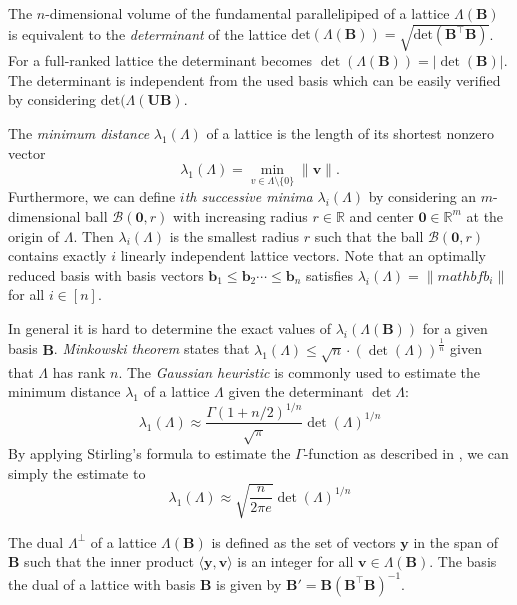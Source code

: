 The $n$-dimensional volume of the fundamental parallelipiped of a lattice $\Lambda(\mathbf{B})$ is equivalent to the \textit{determinant} of the lattice $\text{det}(\Lambda(\mathbf{B})) = \sqrt{\text{det}\left(\mathbf{B}^\intercal \mathbf{B}\right)}$. For a full-ranked lattice the determinant becomes $\det(\Lambda(\mathbf{B})) = |\det(\mathbf{B})|$. The determinant is independent from the used basis which can be easily verified by considering  $\text{det}(\Lambda(\mathbf{U}\mathbf{B})$.

The \textit{minimum distance} $\lambda_1(\Lambda)$ of a lattice is the length of its shortest nonzero vector
\begin{equation}
    \lambda_1(\Lambda) = \min_{v \in \Lambda \setminus \{0\}}\|\mathbf{v}\|.
\end{equation}
Furthermore, we can define \textit{$i$th successive minima} $\lambda_i(\Lambda)$ by considering an $m$-dimensional ball $\mathcal{B}(\mathbf{0}, r)$ with increasing radius $r \in \mathbb{R}$ and center $\mathbf{0} \in \mathbb{R}^m$ at the origin of $\Lambda$. Then  $\lambda_i(\Lambda)$ is the smallest radius $r$ such that the ball $\mathcal{B}(\mathbf{0}, r)$ contains exactly $i$ linearly independent lattice vectors. Note that an optimally reduced basis with basis vectors $\mathbf{b}_1 \leq \mathbf{b}_2 \cdots \leq \mathbf{b}_n$ satisfies $\lambda_i(\Lambda) = \|mathbf{b}_i\|$ for all $i\in [n]$.


In general it is hard to determine the exact values of $\lambda_i(\Lambda(\mathbf{B}))$ for a given basis $\mathbf{B}$. \textit{Minkowski theorem} states that $\lambda_1(\Lambda) \leq \sqrt{n} \cdot (\det(\Lambda))^{\frac{1}{n}}$ given that $\Lambda$ has rank $n$.
The \textit{Gaussian heuristic} is commonly used to estimate the minimum distance $\lambda_1$ of a lattice $\Lambda$ given the determinant $\det{\Lambda}$:
\begin{equation}\label{eq:gaussian-heuristic}
    \lambda_1(\Lambda) \approx \frac{\Gamma(1 + n/2)^{1/n}}{\sqrt{\pi}} \det(\Lambda)^{1/n}
\end{equation}
By applying Stirling's formula to estimate the $\Gamma$-function as described in \cite{Gop16}, we can simply the estimate to
\begin{equation}\label{eq:simplified-gaussian-heuristic}
    \lambda_1(\Lambda) \approx \sqrt{\frac{n}{2\pi e}} \det(\Lambda)^{1/n}
\end{equation}

The dual $\Lambda^{\perp}$ of a lattice $\Lambda(\mathbf{B})$ is defined as the set of vectors $\mathbf{y}$ in the span of $\mathbf{B}$ such that the inner product $\langle \mathbf{y}, \mathbf{v} \rangle$  is an integer for all $\mathbf{v} \in \Lambda(\mathbf{B})$. The basis the dual of a lattice with basis $\mathbf{B}$ is given by $\mathbf{B'} = \mathbf{B} (\mathbf{B}^\intercal \mathbf{B})^{-1}$.

